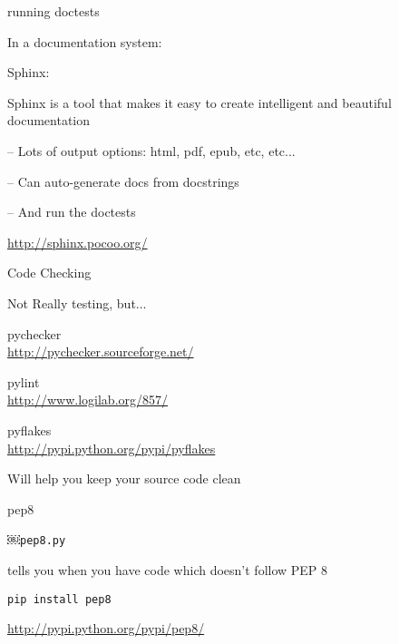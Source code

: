 \documentclass{beamer}
\begin{document}
\begin{frame}[fragile]{running doctests}

\vfill
{\large In a documentation system:}

\vfill
{\LARGE Sphinx:}

\vfill
{\Large Sphinx is a tool that makes it easy to create intelligent and beautiful documentation}

\vfill
{\Large -- Lots of output options: html, pdf, epub, etc, etc...}

\vfill
{\Large -- Can auto-generate docs from docstrings}

\vfill
{\Large -- And run the doctests}

\vfill
\url{http://sphinx.pocoo.org/}
\end{frame} 

\begin{frame}[fragile]{Code Checking}

{\LARGE Not Really testing, but...}

\vfill
{\LARGE pychecker}\\
\url{http://pychecker.sourceforge.net/}

\vfill
{\LARGE pylint}\\
\url{http://www.logilab.org/857/}

\vfill
{\LARGE pyflakes}\\
\url{http://pypi.python.org/pypi/pyflakes}

\vfill
{\Large Will help you keep your source code clean}

\end{frame} 

\begin{frame}[fragile]{pep8}

{\LARGE￼\verb|pep8.py|}

\vfill
{\Large tells you when you have code which doesn't follow PEP 8}

\vfill
\begin{verbatim}
pip install pep8
\end{verbatim}

\vfill
\url{http://pypi.python.org/pypi/pep8/}

\end{frame} 
\end{document}
